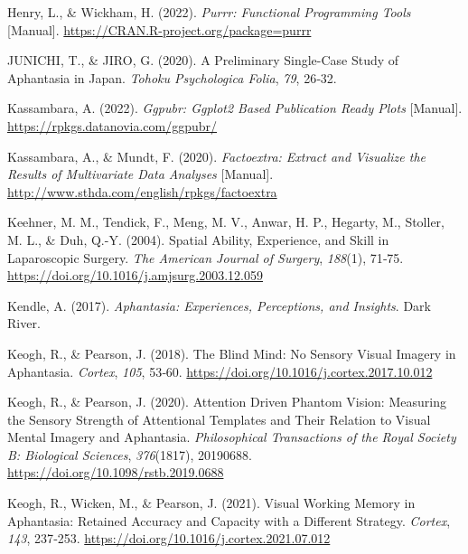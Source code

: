 \documentclass[
  12pt,
]{article}
\newlength{\cslhangindent}
\newlength{\cslentryspacingunit} %
\newenvironment{CSLReferences}[2] %
 {%
  \setlength{\parindent}{0pt}
  \ifodd #1
  \let\oldpar\par
  \def\par{\hangindent=\cslhangindent\oldpar}
  \fi
  \setlength{\parskip}{#2\cslentryspacingunit}
 }%
 {}
\begin{document}
\begin{CSLReferences}{1}{0}
\leavevmode{}%
Henry, L., \& Wickham, H. (2022). \emph{Purrr: {Functional} Programming
Tools} {[}Manual{]}. \url{https://CRAN.R-project.org/package=purrr}

\leavevmode{}%
JUNICHI, T., \& JIRO, G. (2020). A Preliminary Single-Case Study of
Aphantasia in {Japan}. \emph{Tohoku Psychologica Folia}, \emph{79},
26‑32.

\leavevmode{}%
Kassambara, A. (2022). \emph{Ggpubr: Ggplot2 Based Publication Ready
Plots} {[}Manual{]}. \url{https://rpkgs.datanovia.com/ggpubr/}

\leavevmode{}%
Kassambara, A., \& Mundt, F. (2020). \emph{Factoextra: {Extract} and
Visualize the Results of Multivariate Data Analyses} {[}Manual{]}.
\url{http://www.sthda.com/english/rpkgs/factoextra}

\leavevmode{}%
Keehner, M. M., Tendick, F., Meng, M. V., Anwar, H. P., Hegarty, M.,
Stoller, M. L., \& Duh, Q.-Y. (2004). Spatial Ability, Experience, and
Skill in Laparoscopic Surgery. \emph{The American Journal of Surgery},
\emph{188}(1), 71‑75.
\url{https://doi.org/10.1016/j.amjsurg.2003.12.059}

\leavevmode{}%
Kendle, A. (2017). \emph{Aphantasia: {Experiences}, Perceptions, and
Insights}. {Dark River}.

\leavevmode{}%
Keogh, R., \& Pearson, J. (2018). The Blind Mind: {No} Sensory Visual
Imagery in Aphantasia. \emph{Cortex}, \emph{105}, 53‑60.
\url{https://doi.org/10.1016/j.cortex.2017.10.012}

\leavevmode{}%
Keogh, R., \& Pearson, J. (2020). Attention Driven Phantom Vision:
Measuring the Sensory Strength of Attentional Templates and Their
Relation to Visual Mental Imagery and Aphantasia. \emph{Philosophical
Transactions of the Royal Society B: Biological Sciences},
\emph{376}(1817), 20190688. \url{https://doi.org/10.1098/rstb.2019.0688}

\leavevmode{}%
Keogh, R., Wicken, M., \& Pearson, J. (2021). Visual Working Memory in
Aphantasia: {Retained} Accuracy and Capacity with a Different Strategy.
\emph{Cortex}, \emph{143}, 237‑253.
\url{https://doi.org/10.1016/j.cortex.2021.07.012}


\end{CSLReferences}
\end{document}
